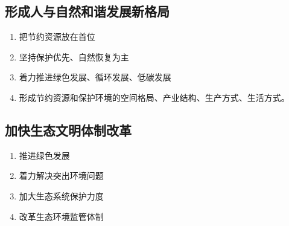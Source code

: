     \subsection{形成人与自然和谐发展新格局}
        \begin{enumerate}
            \item 把节约资源放在首位
            \item 坚持保护优先、自然恢复为主
            \item 着力推进绿色发展、循环发展、低碳发展
            \item 形成节约资源和保护环境的空间格局、产业结构、生产方式、生活方式。
        \end{enumerate}

    \subsection{加快生态文明体制改革}
        \begin{enumerate}
            \item 推进绿色发展
            \item 着力解决突出环境问题
            \item 加大生态系统保护力度
            \item 改革生态环境监管体制
        \end{enumerate}
